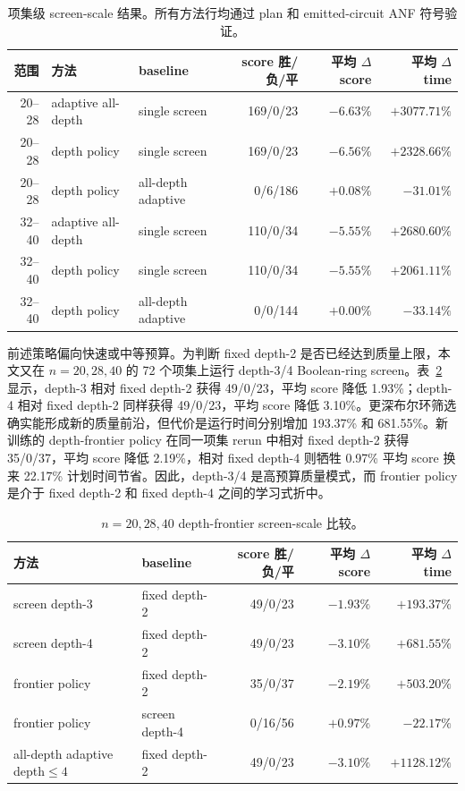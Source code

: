 \documentclass[UTF8,fontset=macnew,11pt]{ctexart}
\newcommand{\screen}{Boolean-ring screen}
\begin{document}
\begin{table}[H]
\centering
\scriptsize
\caption{项集级 screen-scale 结果。所有方法行均通过 plan 和 emitted-circuit ANF 符号验证。}
\label{tab:scale}
\begin{tabular}{rllrrr}
\toprule
范围 & 方法 & baseline & score 胜/负/平 & 平均 $\Delta$ score & 平均 $\Delta$ time \\
\midrule
20--28 & adaptive all-depth & single screen & 169/0/23 & $-6.63\%$ & $+3077.71\%$ \\
20--28 & depth policy & single screen & 169/0/23 & $-6.56\%$ & $+2328.66\%$ \\
20--28 & depth policy & all-depth adaptive & 0/6/186 & $+0.08\%$ & $-31.01\%$ \\
32--40 & adaptive all-depth & single screen & 110/0/34 & $-5.55\%$ & $+2680.60\%$ \\
32--40 & depth policy & single screen & 110/0/34 & $-5.55\%$ & $+2061.11\%$ \\
32--40 & depth policy & all-depth adaptive & 0/0/144 & $+0.00\%$ & $-33.14\%$ \\
\bottomrule
\end{tabular}
\end{table}

前述策略偏向快速或中等预算。为判断 fixed depth-2 是否已经达到质量上限，本文又在 $n=20,28,40$ 的 72 个项集上运行 depth-3/4 \screen{}。表~\ref{tab:frontier} 显示，depth-3 相对 fixed depth-2 获得 49/0/23，平均 score 降低 1.93\%；depth-4 相对 fixed depth-2 同样获得 49/0/23，平均 score 降低 3.10\%。更深布尔环筛选确实能形成新的质量前沿，但代价是运行时间分别增加 193.37\% 和 681.55\%。新训练的 depth-frontier policy 在同一项集 rerun 中相对 fixed depth-2 获得 35/0/37，平均 score 降低 2.19\%，相对 fixed depth-4 则牺牲 0.97\% 平均 score 换来 22.17\% 计划时间节省。因此，depth-3/4 是高预算质量模式，而 frontier policy 是介于 fixed depth-2 和 fixed depth-4 之间的学习式折中。

\begin{table}[H]
\centering
\scriptsize
\caption{$n=20,28,40$ depth-frontier screen-scale 比较。}
\label{tab:frontier}
\begin{tabular}{llrrr}
\toprule
方法 & baseline & score 胜/负/平 & 平均 $\Delta$ score & 平均 $\Delta$ time \\
\midrule
screen depth-3 & fixed depth-2 & 49/0/23 & $-1.93\%$ & $+193.37\%$ \\
screen depth-4 & fixed depth-2 & 49/0/23 & $-3.10\%$ & $+681.55\%$ \\
frontier policy & fixed depth-2 & 35/0/37 & $-2.19\%$ & $+503.20\%$ \\
frontier policy & screen depth-4 & 0/16/56 & $+0.97\%$ & $-22.17\%$ \\
all-depth adaptive depth$\leq4$ & fixed depth-2 & 49/0/23 & $-3.10\%$ & $+1128.12\%$ \\
\bottomrule
\end{tabular}
\end{table}
\end{document}
